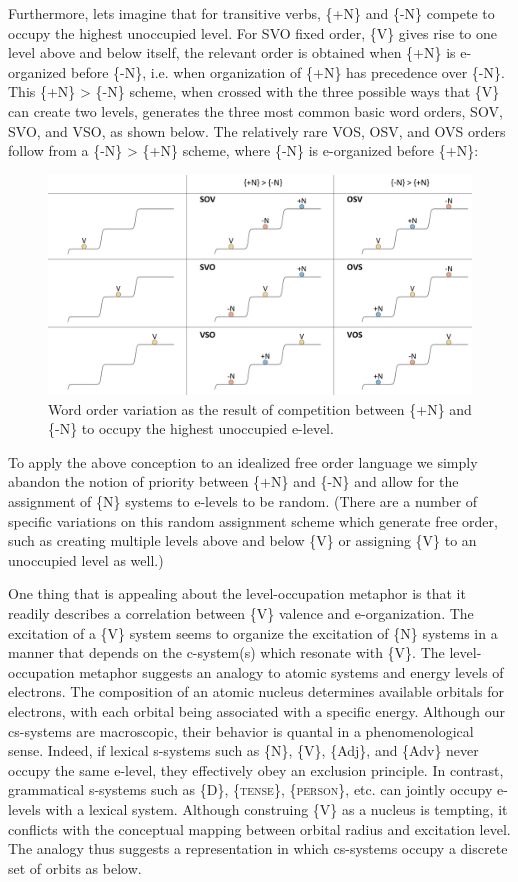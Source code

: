   Furthermore, lets imagine that for transitive verbs, \{+N\} and \{-N\} compete to occupy the highest unoccupied level. For SVO fixed order, \{V\} gives rise to one level above and below itself, the relevant order is obtained when \{+N\} is e-organized before \{-N\}, i.e. when organization of \{+N\} has precedence over \{-N\}. This \{+N\} > \{-N\} scheme, when crossed with the three possible ways that \{V\} can create two levels, generates the three most common basic word orders, SOV, SVO, and VSO, as shown below. The relatively rare VOS, OSV, and OVS orders follow from a \{-N\} > \{+N\} scheme, where \{-N\} is e-organized before \{+N\}:

  
\begin{figure}
\includegraphics[width=\textwidth]{figures/Tilsen-img75.png}
\caption{Word order variation as the result of competition between \{+N\} and \{-N\} to occupy the highest unoccupied e-level.}
\label{fig:4:25}
\end{figure}
 

  To apply the above conception to an idealized free order language we simply abandon the notion of priority between \{+N\} and \{-N\} and allow for the assignment of \{N\} systems to e-levels to be random. (There are a number of specific variations on this random assignment scheme which generate free order, such as creating multiple levels above and below \{V\} or assigning \{V\} to an unoccupied level as well.)

  One thing that is appealing about the level-occupation metaphor is that it readily describes a correlation between \{V\} valence and e-organization. The excitation of a \{V\} system seems to organize the excitation of \{N\} systems in a manner that depends on the c-system(s) which resonate with \{V\}. The level-occupation metaphor suggests an analogy to atomic systems and energy levels of electrons. The composition of an atomic nucleus determines available orbitals for electrons, with each orbital being associated with a specific energy. Although our cs-systems are macroscopic, their behavior is quantal in a phenomenological sense. Indeed, if lexical s-systems such as \{N\}, \{V\}, \{Adj\}, and \{Adv\} never occupy the same e-level, they effectively obey an exclusion principle. In contrast, grammatical s-systems such as \{D\}, \{\textsc{tense}\}, \{\textsc{person}\}, etc. can jointly occupy e-levels with a lexical system. Although construing \{V\} as a nucleus is tempting, it conflicts with the conceptual mapping between orbital radius and excitation level. The analogy thus suggests a representation in which cs-systems occupy a discrete set of orbits as below.

